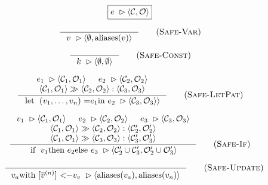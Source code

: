\begin{figure}
\begin{equation*}
\boxed{
e\ \rhd \langle \mathcal{C}, \mathcal{O} \rangle
}
\end{equation*}

  \begin{equation*}
\inference{
}{
\inPlaceSafe{v}{\emptyset}{\aliases{v}}
}
\tagsc{Safe-Var}
\end{equation*}

\begin{equation*}
\inference{
}{
\inPlaceSafe{k}{\emptyset}{\emptyset}
}
\tagsc{Safe-Const}
\end{equation*}

\begin{equation*}
\inference{
  \inPlaceSafe{e_{1}}{\mathcal{C}_{1}}{\mathcal{O}_{1}}
  &
  \inPlaceSafe{e_{2}}{\mathcal{C}_{2}}{\mathcal{O}_{2}}
  \\
  \seqOccurences
  {\langle\mathcal{C}_{1},\mathcal{O}_{1}\rangle}
  {\langle\mathcal{C}_{2},\mathcal{O}_{2}\rangle}
  {\langle\mathcal{C}_{3},\mathcal{O}_{3}\rangle}
}{
  \inPlaceSafe{\text{\lstinline[mathescape]!let ($v_{1}, \ldots, v_{n}$) = $e_{1}$ in\ $e_{2}$!}}
  {\mathcal{C}_{3}}{\mathcal{O}_{3}\rangle}
}
\tagsc{Safe-LetPat}
\end{equation*}

\begin{equation*}
\inference{
  \inPlaceSafe{v_{1}}{\mathcal{C}_{1}}{\mathcal{O}_{1}}
  &
  \inPlaceSafe{e_{2}}{\mathcal{C}_{2}}{\mathcal{O}_{2}}
  &
  \inPlaceSafe{e_{3}}{\mathcal{C}_{3}}{\mathcal{O}_{3}}
  \\
  \seqOccurences
  {\langle\mathcal{C}_{1},\mathcal{O}_{1}\rangle}
  {\langle\mathcal{C}_{2},\mathcal{O}_{2}\rangle}
  {\langle\mathcal{C}_{2}',\mathcal{O}_{2}'\rangle}
  \\
  \seqOccurences
  {\langle\mathcal{C}_{1},\mathcal{O}_{1}\rangle}
  {\langle\mathcal{C}_{3},\mathcal{O}_{3}\rangle}
  {\langle\mathcal{C}_{3}',\mathcal{O}_{3}'\rangle}
}{
  \inPlaceSafe{\text{\lstinline[mathescape]!if\ $v_{1}$ then\ $e_{2}$ else\ $e_{3}$!}}
  {\mathcal{C}'_{2}\cup\mathcal{C}'_{3}}
  {\mathcal{O}'_{2}\cup\mathcal{O}'_{3}}
}
\tagsc{Safe-If}
\end{equation*}

\begin{equation*}
\inference{
}{
  \inPlaceSafe{
    \text{\lstinline[mathescape]!$v_{a}$ with [$\nseq{v}{n}$] <- $v_{v}$!}
  }{\aliases{v_{a}}}{\aliases{v_{n}}}
}\tagsc{Safe-Update}
\end{equation*}


\end{figure}
